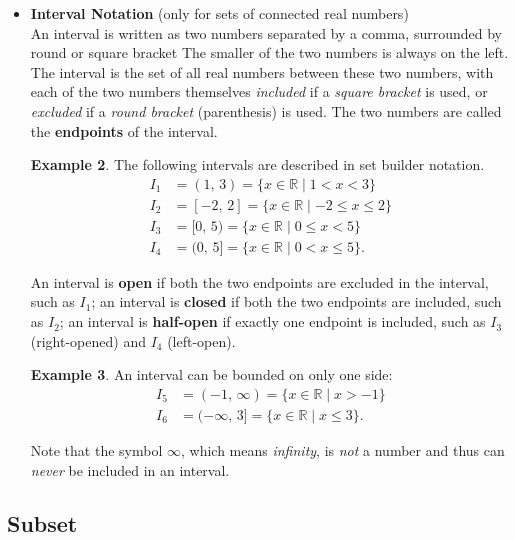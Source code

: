 \documentclass[
]{book}
\theoremstyle{definition}
\theoremstyle{definition}
\newtheorem{example}{Example}[chapter]
\theoremstyle{definition}
\theoremstyle{definition}
\theoremstyle{remark}
\begin{document}
\begin{itemize}
\begin{example}
  \end{example}
\item
  \textbf{Interval Notation} (only for sets of connected real numbers)\\
  An interval is written as two numbers separated by a comma, surrounded by round or square bracket The smaller of the two numbers is always on the left. The interval is the set of all real numbers between these two numbers, with each of the two numbers themselves \emph{included} if a \emph{square bracket} is used, or \emph{excluded} if a \emph{round bracket} (parenthesis) is used. The two numbers are called the \textbf{endpoints} of the interval.

  \begin{example}
  \protect\hypertarget{exm:interval}{}\label{exm:interval}The following intervals are described in set builder notation.
  \begin{align*}
  I_1 &= (1,\, 3) = \{x \in \mathbb{R} \mid 1 < x < 3\}\\
  I_2 &= [-2,\, 2] = \{x \in \mathbb{R} \mid -2 \le x \le 2\}\\
  I_3 &= [0,\, 5) = \{x \in \mathbb{R} \mid 0 \le x < 5\}\\
  I_4 &= (0,\, 5] = \{x \in \mathbb{R} \mid 0 < x \le 5\} .
  \end{align*}
  \end{example}

  An interval is \textbf{open} if both the two endpoints are excluded in the interval, such as \(I_1\); an interval is \textbf{closed} if both the two endpoints are included, such as \(I_2\); an interval is \textbf{half-open} if exactly one endpoint is included, such as \(I_3\) (right-opened) and \(I_4\) (left-open).

  \begin{example}
  \protect\hypertarget{exm:inf-interval}{}\label{exm:inf-interval}An interval can be bounded on only one side:
  \begin{align*}
  I_5 &= (-1,\, \infty) = \{x \in \mathbb{R} \mid x > -1\}\\
  I_6 &= (-\infty,\, 3] = \{x \in \mathbb{R} \mid x \le 3\} .
  \end{align*}
  \end{example}

  Note that the symbol \(\infty\), which means \emph{infinity}, is \emph{not} a number and thus can \emph{never} be included in an interval.
\end{itemize}

\hypertarget{subset}{%
\subsection{Subset}\label{subset}}
\end{document}
